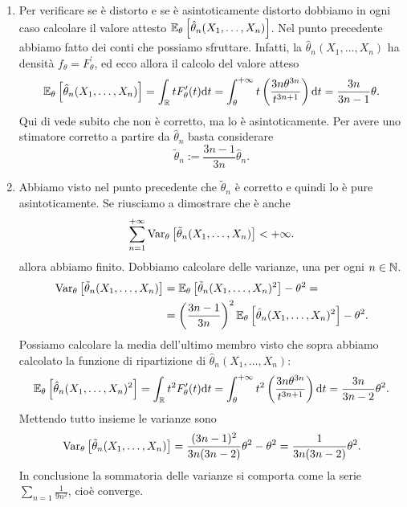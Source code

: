 \begin{soluzione}
\begin{enumerate}
\[
  F_{X_i, \theta}(t) = \int_{-\infty}^t L_0(\theta, x) \mathrm d x = \begin{cases} 0 & \text{se } t < \theta \\ 1 - \frac{\theta^3}{t^3} & \text{se } t \ge \theta \end{cases}
\]
Possiamo concludere questo punto allora
\[
  F_{\theta}(t) = \begin{cases} 0 & \text{se } t < \theta \\ 1 - \frac{\theta^{3n}}{t^{3n}} & \text{se } t \ge \theta \end{cases} = \left( 1 - \frac{\theta^{3n}}{t^{3n}} \right) \ind{[\theta, +\infty)}{t}.
\]

\item Per verificare se è distorto e se è asintoticamente distorto dobbiamo in ogni caso calcolare il valore attesto $\mathbb E_{\theta}\left[\hat\theta_n(X_1, \dots, X_n)\right]$. Nel punto precedente abbiamo fatto dei conti che possiamo sfruttare. Infatti, la $\hat\theta_n(X_1, \dots, X_n)$ ha densità $f_\theta = F_\theta^\prime$, ed ecco allora il calcolo del valore atteso
\[
  \mathbb E_{\theta}\left[\hat\theta_n(X_1, \dots, X_n)\right] = \int_{\mathbb R}t F_{\theta}^{\prime}(t) \mathrm d t = \int_{\theta}^{+\infty} t \left(\frac{3n \theta^{3n}}{t^{3n+1}} \right) \mathrm d t = \frac{3n}{3n - 1} \theta.
\]
Qui di vede subito che non è corretto, ma lo è asintoticamente. Per avere uno stimatore corretto a partire da $\hat\theta_n$ basta considerare
\[
  \tilde\theta_n := \frac{3n-1}{3n} \hat\theta_n .
\]

\item Abbiamo visto nel punto precedente che $\tilde\theta_n$ è corretto e quindi lo è pure asintoticamente. Se riusciamo a dimostrare che è anche
\[
	\sum_{n = 1}^{+\infty} \operatorname{Var}_\theta \left[ \tilde\theta_n(X_1, \dots, X_n) \right] < +\infty .
\]
allora abbiamo finito. Dobbiamo calcolare delle varianze, una per ogni $n \in \mathbb N$. %
\begin{align*}
	\operatorname{Var}_\theta \left[ \tilde\theta_n(X_1, \dots, X_n) \right] & = \mathbb E_\theta \left[ \tilde\theta_n(X_1, \dots, X_n) ^2 \right] - \theta^2 = \\
	& = \left(\frac{3n-1}{3n}\right)^2 \mathbb E_\theta \left[ \hat\theta_n(X_1, \dots, X_n) ^2 \right] - \theta^2 .
\end{align*}
Possiamo calcolare la media dell'ultimo membro visto che sopra abbiamo calcolato la funzione di ripartizione di $\hat\theta_n(X_1, \dots, X_n)$:
\[
	\mathbb E_\theta \left[ \hat\theta_n(X_1, \dots, X_n) ^2 \right] = \int_{\mathbb R} t^2 F_\theta^\prime(t) \mathrm d t = \int_\theta^{+\infty} t^2 \left(\frac{3n \theta^{3n}}{t^{3n+1}} \right) \mathrm d t = \frac{3n}{3n-2} \theta^2 .
\]
Mettendo tutto insieme le varianze sono
\[
	\operatorname{Var}_\theta \left[ \tilde\theta_n(X_1, \dots, X_n) \right] = \frac{(3n-1)^2}{3n(3n-2)}\theta^2 -\theta^2 = \frac{1}{3n(3n-2)} \theta^2 .
\]
In conclusione la sommatoria delle varianze si comporta come la serie $\sum_{n=1} \frac{1}{9n^2}$, cioè converge.


\end{enumerate}
\end{soluzione}
